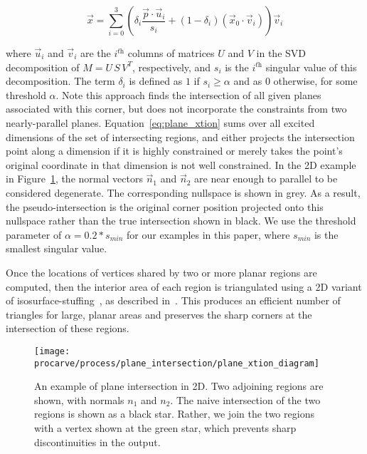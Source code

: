 \documentclass[12pt,onecolumn,oneside]{book}
\begin{document}
\begin{equation}
	\vec{x} = \sum_{i = 0}^{3} \left( \delta_i \dfrac{\vec{p} \cdot \vec{u}_i}{s_i} + (1-\delta_i) ( \vec{x}_0 \cdot \vec{v}_i ) \right) \vec{v}_i
	\label{eq:plane_xtion}
\end{equation}

where $\vec{u}_i$ and $\vec{v}_i$ are the $i^{\textit{th}}$ columns of matrices $U$ and $V$ in the SVD decomposition of $M = U \, S \, V^T$, respectively, and $s_i$ is the $i^{\textit{th}}$ singular value of this decomposition.  The term $\delta_i$ is defined as $1$ if $s_i \geq \alpha$ and as $0$ otherwise, for some threshold $\alpha$.  Note this approach finds the intersection of all given planes associated with this corner, but does not incorporate the constraints from two nearly-parallel planes.  Equation~\ref{eq:plane_xtion} sums over all excited dimensions of the set of intersecting regions, and either projects the intersection point along a dimension if it is highly constrained or merely takes the point's original coordinate in that dimension is not well constrained.  In the 2D example in Figure~\ref{fig:plane_xtion}, the normal vectors $\vec{n}_1$ and $\vec{n}_2$ are near enough to parallel to be considered degenerate.  The corresponding nullspace is shown in grey.  As a result, the pseudo-intersection is the original corner position projected onto this nullspace rather than the true intersection shown in black. We use the threshold parameter of $\alpha=0.2 * s_{min}$ for our examples in this paper, where $s_{min}$ is the smallest singular value.

Once the locations of vertices shared by two or more planar regions are computed, then the interior area of each region is triangulated using a 2D variant of isosurface-stuffing~\cite{Isostuffing}, as described in~\cite{Turner13}.  This produces an efficient number of triangles for large, planar areas and preserves the sharp corners at the intersection of these regions. 

\begin{figure}
	\centerline{\texttt{[image: procarve/process/plane\_intersection/plane\_xtion\_diagram]}}
	\caption[Computing intersection point for planar regions.]{An example of plane intersection in 2D.  Two adjoining regions are shown, with normals $n_1$ and $n_2$.  The naive intersection of the two regions is shown as a black star.  Rather, we join the two regions with a vertex shown at the green star, which prevents sharp discontinuities in the output.}
	\label{fig:plane_xtion}
\end{figure}
\end{document}
